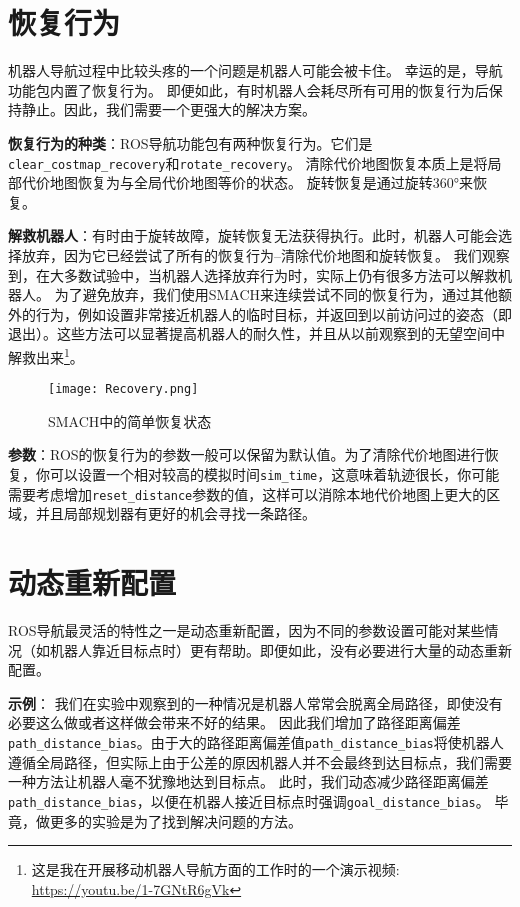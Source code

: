 \section[Recovery Behaviors]{恢复行为}%

机器人导航过程中比较头疼的一个问题是机器人可能会被卡住。 幸运的是，导航功能包内置了恢复行为。 
即便如此，有时机器人会耗尽所有可用的恢复行为后保持静止。因此，我们需要一个更强大的解决方案。

\textbf{恢复行为的种类}：ROS导航功能包有两种恢复行为。它们是\texttt{clear_costmap_recovery}和\texttt{rotate_recovery}。
清除代价地图恢复本质上是将局部代价地图恢复为与全局代价地图等价的状态。
旋转恢复是通过旋转360°来恢复。

\textbf{解救机器人}：有时由于旋转故障，旋转恢复无法获得执行。此时，机器人可能会选择放弃，因为它已经尝试了所有的恢复行为--清除代价地图和旋转恢复。
我们观察到，在大多数试验中，当机器人选择放弃行为时，实际上仍有很多方法可以解救机器人。
为了避免放弃，我们使用SMACH来连续尝试不同的恢复行为，通过其他额外的行为，例如设置非常接近机器人的临时目标，并返回到以前访问过的姿态（即退出）。这些方法可以显著提高机器人的耐久性，并且从以前观察到的无望空间中解救出来\footnote{这是我在开展移动机器人导航方面的工作时的一个演示视频: \url{https://youtu.be/1-7GNtR6gVk}}。

\begin{figure}[!h]
	\begin{center}
		\texttt{[image: Recovery.png]} 
		\caption{SMACH中的简单恢复状态}
	\end{center}
\end{figure}

\textbf{参数}：ROS的恢复行为的参数一般可以保留为默认值。为了清除代价地图进行恢复，你可以设置一个相对较高的模拟时间\texttt{sim_time}，这意味着轨迹很长，你可能需要考虑增加\texttt{reset_distance}参数的值，这样可以消除本地代价地图上更大的区域，并且局部规划器有更好的机会寻找一条路径。

\section[Dynamic Reconfigure]{动态重新配置}%

ROS导航最灵活的特性之一是动态重新配置，因为不同的参数设置可能对某些情况（如机器人靠近目标点时）更有帮助。即便如此，没有必要进行大量的动态重新配置。

\textbf{示例}：
我们在实验中观察到的一种情况是机器人常常会脱离全局路径，即使没有必要这么做或者这样做会带来不好的结果。
因此我们增加了路径距离偏差\texttt{path_distance_bias}。由于大的路径距离偏差值\texttt{path_distance_bias}将使机器人遵循全局路径，但实际上由于公差的原因机器人并不会最终到达目标点，我们需要一种方法让机器人毫不犹豫地达到目标点。
此时，我们动态减少路径距离偏差\texttt{path_distance_bias}，以便在机器人接近目标点时强调\texttt{goal_distance_bias}。
毕竟，做更多的实验是为了找到解决问题的方法。

